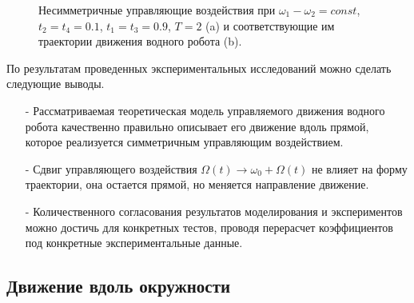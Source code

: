 \begin{figure}[!ht]
	\begin{minipage}[h]{0.5\linewidth}
	\end{minipage}
	\hfill
	\begin{minipage}[h]{0.5\linewidth}
	\end{minipage}
	\caption{Несимметричные управляющие воздействия при $\omega_1 - \omega_2 = const$, $t_2 = t_4 = 0.1$, $t_1 = t_3 = 0.9$, $T = 2$ (a) и соответствующие им траектории движения водного робота (b).}
	\label{DifferentAmp}
\end{figure}


По результатам проведенных экспериментальных исследований можно сделать следующие выводы.
\begin{itemize}
	\item[-] Рассматриваемая теоретическая модель управляемого движения водного робота качественно правильно  описывает его движение вдоль прямой, которое реализуется симметричным управляющим воздействием.
	
	\item[-] Сдвиг управляющего воздействия $\Omega(t) \rightarrow \omega_0 + \Omega(t)$ не влияет на форму траектории, она остается прямой, но меняется направление движение.
	
	\item[-] Количественного согласования результатов моделирования и экспериментов можно достичь для конкретных тестов, проводя перерасчет коэффициентов под конкретные экспериментальные данные.
\end{itemize}



\subsection{Движение вдоль окружности}

